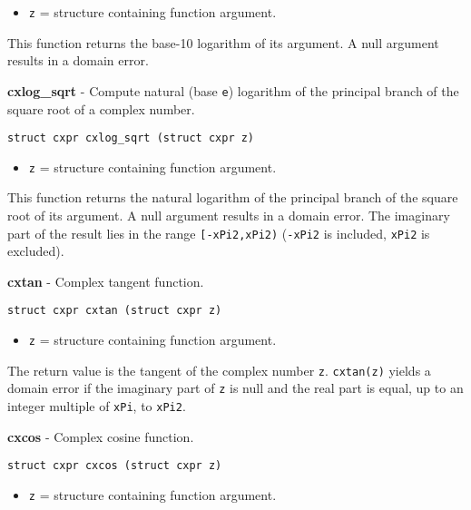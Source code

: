 \documentclass{article}
\begin{document}
\begin{itemize}
\item \texttt{z} = structure containing function argument.
\end{itemize}

This function returns the base-10 logarithm of
its argument. A null argument results in a
domain error.


\hrulefill{}

\textbf{cxlog\_sqrt} - Compute natural (base \texttt{e}) logarithm of the
principal branch of the square root of a complex number.

\begin{verbatim}
struct cxpr cxlog_sqrt (struct cxpr z)
\end{verbatim}

\begin{itemize}
\item \texttt{z} = structure containing function argument.
\end{itemize}

This function returns the natural logarithm of
the principal branch of the square root of its argument. 
A null argument results in a domain error.
The imaginary part of the result lies in the range
\texttt{[-xPi2,xPi2)} (\texttt{-xPi2} is included, \texttt{xPi2} is excluded).


\hrulefill{}

\textbf{cxtan} - Complex tangent function.

\begin{verbatim}
struct cxpr cxtan (struct cxpr z)
\end{verbatim}

\begin{itemize}
\item \texttt{z} = structure containing function argument.
\end{itemize}

The return value is the tangent of the complex number \texttt{z}.
\texttt{cxtan(z)} yields a domain error if the imaginary
part of \texttt{z} is null and the real part is equal,
up to an integer multiple of \texttt{xPi}, to \texttt{xPi2}.


\hrulefill{}

\textbf{cxcos} - Complex cosine function.

\begin{verbatim}
struct cxpr cxcos (struct cxpr z)
\end{verbatim}

\begin{itemize}
\item \texttt{z} = structure containing function argument.
\end{itemize}
\end{document}
